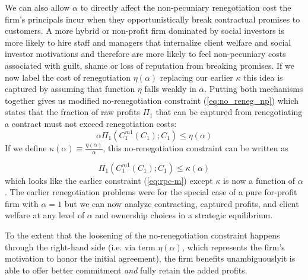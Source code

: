 \documentclass[11pt,english]{article}
\theoremstyle{plain}
\theoremstyle{definition}
\begin{document}
We can also allow $\alpha$ to directly affect the non-pecuniary renegotiation
cost the firm's principals incur when they opportunistically break
contractual promises to customers. A more hybrid or non-profit firm
dominated by social investors is more likely to hire staff and managers
that internalize client welfare and social investor motivations and
therefore are more likely to feel non-pecuniary costs associated with
guilt, shame or loss of reputation from breaking promises. If we now
label the cost of renegotiation $\eta\left(\alpha\right)$ \textendash{}
replacing our earlier $\kappa$ \textendash{} this idea is captured
by assuming that function $\eta$ falls weakly in $\alpha$. Putting
both mechanisms together gives us modified no-renegotiation constraint
(\ref{eq:no_reneg_np}) which states that the fraction of raw profits
$\Pi_{1}$ that can be captured from renegotiating a contract must
not exceed renegotiation costs: 
\begin{equation}
\alpha\Pi_{1}(C_{1}^{m1}(C_{1});C_{1})\leq\eta(\alpha)\label{eq:no_reneg_np}
\end{equation}
If we define $\kappa(\alpha)\equiv\frac{\eta(\alpha)}{\alpha}$, this
no-renegotiation constraint can be written as

\begin{equation}
\Pi_{1}(C_{1}^{m1}(C_{1});C_{1})\leq\kappa(\alpha)\label{eq:no-kalpha}
\end{equation}
which looks like the earlier constraint (\ref{eq:rpc-m}) except $\kappa$
is now a function of $\alpha$. The earlier renegotiation problems
were for the special case of a pure for-profit firm with $\alpha=1$
but we can now analyze contracting, captured profits, and client welfare
at any level of $\alpha$ and ownership choices in a strategic equilibrium.

To the extent that the loosening of the no-renegotiation constraint
happens through the right-hand side (i.e. via term $\eta\left(\alpha\right)$,
which represents the firm's motivation to honor the initial agreement),
the firm benefits unambiguously\textendash it is able to offer better
commitment \emph{and} fully retain the added profits.
\end{document}
